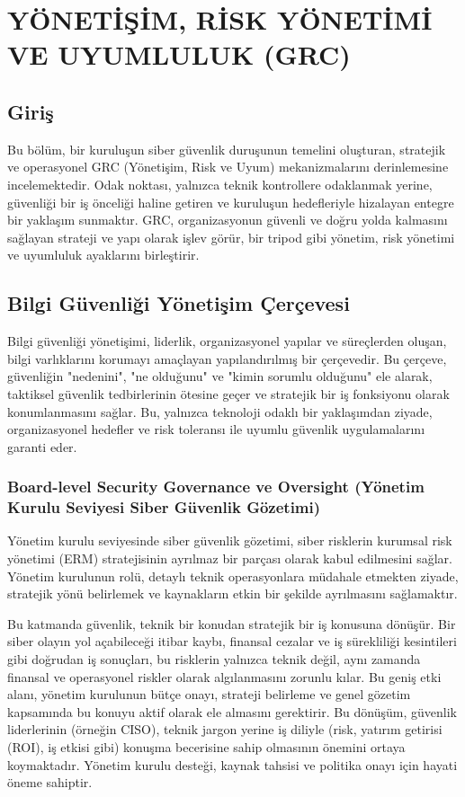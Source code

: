 \chapter{YÖNETİŞİM, RİSK YÖNETİMİ VE UYUMLULUK (GRC)}

\section*{Giriş}

Bu bölüm, bir kuruluşun siber güvenlik duruşunun temelini oluşturan, stratejik ve operasyonel GRC (Yönetişim, Risk ve Uyum) mekanizmalarını derinlemesine incelemektedir. Odak noktası, yalnızca teknik kontrollere odaklanmak yerine, güvenliği bir iş önceliği haline getiren ve kuruluşun hedefleriyle hizalayan entegre bir yaklaşım sunmaktır. GRC, organizasyonun güvenli ve doğru yolda kalmasını sağlayan strateji ve yapı olarak işlev görür, bir tripod gibi yönetim, risk yönetimi ve uyumluluk ayaklarını birleştirir.

\section{Bilgi Güvenliği Yönetişim Çerçevesi}

Bilgi güvenliği yönetişimi, liderlik, organizasyonel yapılar ve süreçlerden oluşan, bilgi varlıklarını korumayı amaçlayan yapılandırılmış bir çerçevedir. Bu çerçeve, güvenliğin "nedenini", "ne olduğunu" ve "kimin sorumlu olduğunu" ele alarak, taktiksel güvenlik tedbirlerinin ötesine geçer ve stratejik bir iş fonksiyonu olarak konumlanmasını sağlar. Bu, yalnızca teknoloji odaklı bir yaklaşımdan ziyade, organizasyonel hedefler ve risk toleransı ile uyumlu güvenlik uygulamalarını garanti eder.

\subsection{Board-level Security Governance ve Oversight (Yönetim Kurulu Seviyesi Siber Güvenlik Gözetimi)}

Yönetim kurulu seviyesinde siber güvenlik gözetimi, siber risklerin kurumsal risk yönetimi (ERM) stratejisinin ayrılmaz bir parçası olarak kabul edilmesini sağlar. Yönetim kurulunun rolü, detaylı teknik operasyonlara müdahale etmekten ziyade, stratejik yönü belirlemek ve kaynakların etkin bir şekilde ayrılmasını sağlamaktır.

Bu katmanda güvenlik, teknik bir konudan stratejik bir iş konusuna dönüşür. Bir siber olayın yol açabileceği itibar kaybı, finansal cezalar ve iş sürekliliği kesintileri gibi doğrudan iş sonuçları, bu risklerin yalnızca teknik değil, aynı zamanda finansal ve operasyonel riskler olarak algılanmasını zorunlu kılar. Bu geniş etki alanı, yönetim kurulunun bütçe onayı, strateji belirleme ve genel gözetim kapsamında bu konuyu aktif olarak ele almasını gerektirir. Bu dönüşüm, güvenlik liderlerinin (örneğin CISO), teknik jargon yerine iş diliyle (risk, yatırım getirisi (ROI), iş etkisi gibi) konuşma becerisine sahip olmasının önemini ortaya koymaktadır. Yönetim kurulu desteği, kaynak tahsisi ve politika onayı için hayati öneme sahiptir.

